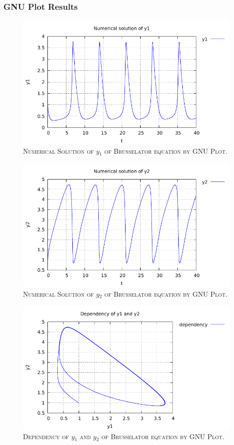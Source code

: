 \documentclass[a4paper,oneside]{book}
\numberwithin{equation}{chapter}
\begin{document}
\subsubsection{GNU Plot Results}
\begin{figure}[H]
\centering
\includegraphics[scale=1.15]{b_1}
\caption{\textsc{Numerical Solution of $y_1$ of Brusselator equation by GNU Plot.}}
\end{figure}
\begin{figure}[H]
\centering
\includegraphics[scale=1.15]{b_2}
\caption{\textsc{Numerical Solution of $y_2$ of Brusselator equation by GNU Plot.}}
\end{figure}
\begin{figure}[H]
\centering
\includegraphics[scale=1.15]{b_d_1_2}
\caption{\textsc{Dependency of $y_1$ and $y_2$ of Brusselator equation by GNU Plot.}}
\end{figure}
\end{document}
